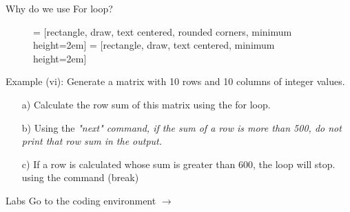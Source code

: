 \documentclass{beamer}\usepackage[]{graphicx}\usepackage[]{xcolor}
\begin{document}
\begin{frame}{Why do we use For loop?}
    \begin{figure}
        \centering
     = [rectangle, draw, text centered, rounded corners, minimum height=2em]
     = [rectangle, draw, text centered, minimum height=2em]
\end{figure}
\end{frame}

\begin{frame}
    \begin{exampleblock}{Example (vi):}
Generate a matrix with 10 rows and 10 columns of integer values.
\begin{itemize}
    \item[a)] Calculate the row sum of this matrix using the for loop.
    \item[b)] Using the \it{"next"} command, if the sum of a row is more than 500, do not print that row sum in the output. 
    \item[c)] If a row is calculated whose sum is greater than 600, the loop will stop. using the command (break) 
\end{itemize}
    \end{exampleblock}
\end{frame}
\begin{frame}{Labs}
    \alert{{\Large Go to the coding environment $\rightarrow$}}
    \end{frame}
    
\end{document}
